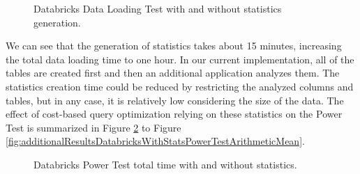 \begin{figure}
   \begin{center}
   \end{center}
   \caption{Databricks Data Loading Test with and without statistics generation.}
   \label{fig:additionalResultsDatabricksWithStatsDataLoading}
\end{figure}

We can see that the generation of statistics takes about 15 minutes, increasing the total data loading time to one hour. In our current implementation, all of the tables are created first and then an additional application analyzes them. The statistics creation time could be reduced by restricting the analyzed columns and tables, but in any case, it is relatively low considering the size of the data. The effect of cost-based query optimization relying on these statistics on the Power Test is summarized in Figure \ref{fig:additionalResultsDatabricksWithStatsPowerTestTotalTime} to Figure \ref{fig:additionalResultsDatabricksWithStatsPowerTestArithmeticMean}.

\begin{figure}
   \begin{center}
   \end{center}
   \caption{Databricks Power Test total time with and without statistics.}
   \label{fig:additionalResultsDatabricksWithStatsPowerTestTotalTime}
\end{figure}

